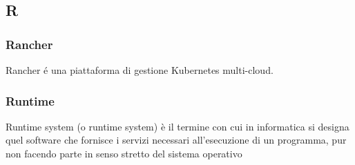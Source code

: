\subsection*{\textbf{\hfill \Huge{R} \hfill}} 
\subsubsection*{Rancher}
Rancher é una piattaforma di gestione Kubernetes multi-cloud.
\subsubsection*{Runtime}
Runtime system (o runtime system) è il termine con cui in informatica si designa quel software che fornisce i servizi necessari all'esecuzione di un programma, pur non facendo parte in senso stretto del sistema operativo

